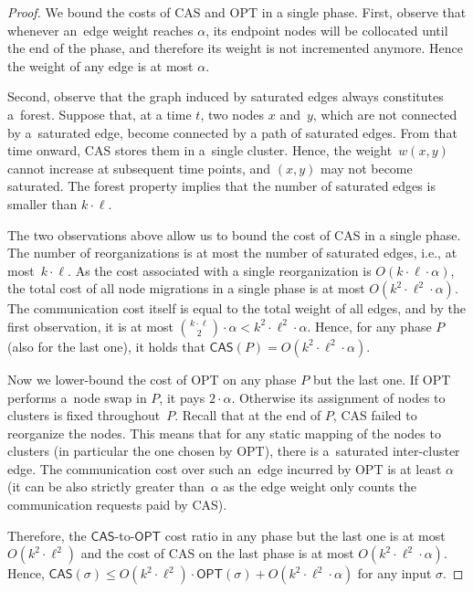 \documentclass[a4paper,anonymous,USenglish]{lipics-v2019}
\newcommand{\OPT}{\textsf{OPT}\xspace}
\newcommand{\DET}{\textsf{CAS}\xspace}
\begin{document}
\begin{proof}
We bound the costs of \DET and \OPT in a single phase. First, observe that
whenever an~edge weight reaches $\alpha$, its endpoint nodes will be collocated 
until the end of the phase, and therefore its weight is not
incremented anymore. Hence the weight of any edge is at most $\alpha$.

Second, observe that the graph induced by saturated edges always constitutes 
a~forest. Suppose that, at a time $t$,
two nodes $x$ and~$y$, which are not
connected by a~saturated edge, become connected by a path of saturated edges.
From that time onward, \DET stores them in a~single cluster. Hence, the
weight~$w(x,y)$ cannot increase at subsequent time points, and $(x,y)$ may
not become saturated. The forest property implies that the number of saturated
edges is smaller than $k \cdot \ell$.

The two observations above allow us to bound the cost of \DET in a single
phase. The number of reorganizations is at most the number of saturated edges,
i.e., at most~$k \cdot \ell$. As the cost associated with a single
reorganization is $O(k \cdot \ell \cdot \alpha)$, the total cost of all node
migrations in a single phase is at most $O(k^2 \cdot \ell^2 \cdot \alpha)$.
The communication cost itself is equal to the total weight of all edges, and
by the first observation, it is at most $\binom{k \cdot \ell}{2}
\cdot \alpha < k^2 \cdot \ell^2 \cdot \alpha$. Hence, for any phase $P$ (also
for the last one), it holds that $\DET(P) = O(k^2 \cdot \ell^2 \cdot \alpha)$.

Now we lower-bound the cost of \OPT on any phase $P$ but the last one. If \OPT
performs a~node swap in $P$, it pays $2 \cdot \alpha$. Otherwise its assignment of
nodes to clusters is fixed throughout~$P$. Recall that at the end of $P$, \DET
failed to reorganize the nodes. This means that for any static mapping of the
nodes to clusters (in particular the one chosen by \OPT), there is a~saturated inter-cluster edge. The communication cost over such an~edge incurred
by \OPT is at least $\alpha$ (it can be also strictly greater than~$\alpha$ as
the edge weight only counts the communication requests paid by \DET).

Therefore, the $\DET$-to-$\OPT$ cost ratio in any phase but the last one is at
most $O(k^2 \cdot \ell^2)$ and the cost of \DET on the last phase is at
most $O(k^2 \cdot \ell^2 \cdot \alpha)$. Hence,
$\DET(\sigma) \leq O(k^2 \cdot \ell^2) \cdot \OPT(\sigma) + O(k^2 \cdot
\ell^2 \cdot \alpha)$ for any input $\sigma$.
\end{proof}
\end{document}

